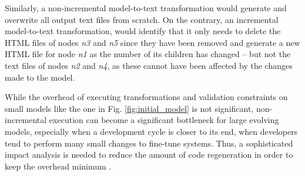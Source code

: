 \documentclass[sigconf]{acmart}
\begin{document}
Similarly, a non-incremental model-to-text transformation would generate and overwrite all output text files from scratch. On the contrary, an incremental model-to-text transformation, would identify that it only needs to delete the HTML files of nodes \emph{n3} and \emph{n5} since they have been removed and generate a new HTML file for node \emph{n1} as the number of its children has changed -- but not the text files of nodes \emph{n2} and \emph{n4}, as these cannot have been affected by the changes made to the model.

While the overhead of executing transformations and validation constraints on small models like the one in Fig. \ref{fig:initial_model} is not significant, non-incremental execution can become a significant bottleneck for large evolving models, especially when a development cycle is closer to its end, when developers tend to perform many small changes to fine-tune systems. Thus, a sophisticated impact analysis is needed to reduce the amount of code regeneration in order to keep the overhead minimum \cite{selic2003pragmatics}.  
\end{document}
